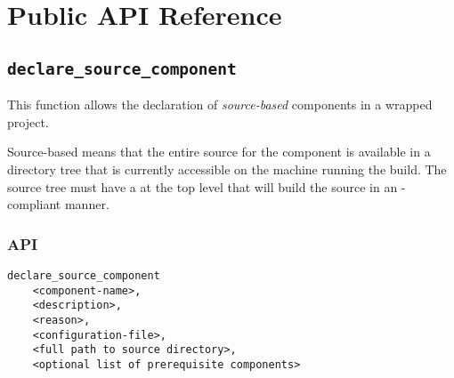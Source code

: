 %
%
%
%
\chapter{Public API Reference}
\section{\texttt{declare\_source\_component}}\label{api:declare-source-component}

This function allows the declaration of \emph{source-based} components
in a wrapped project.

Source-based means that the entire source for the component is
available in a directory tree that is currently accessible on the
machine running the build.  The source tree must have a \makefile at
the top level that will build the source in an \lmsbw-compliant
manner.

\subsection{API}

\begin{verbatim}
declare_source_component
    <component-name>,
    <description>,
    <reason>,
    <configuration-file>,
    <full path to source directory>,
    <optional list of prerequisite components>
\end{verbatim}

